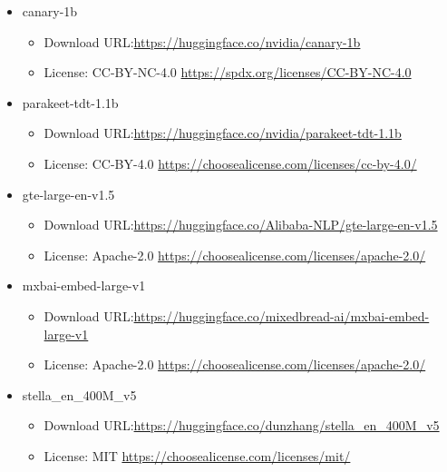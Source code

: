 \documentclass[11pt]{article}
\begin{document}
\begin{itemize}
		\item canary-1b
		\begin{itemize}
			\item Download URL:\newline \url{https://huggingface.co/nvidia/canary-1b}
			\item License: CC-BY-NC-4.0  \newline \url{https://spdx.org/licenses/CC-BY-NC-4.0}
		\end{itemize}
		
		\item parakeet-tdt-1.1b
		\begin{itemize}
			\item Download URL:\newline \url{https://huggingface.co/nvidia/parakeet-tdt-1.1b}
			\item License: CC-BY-4.0  \newline \url{https://choosealicense.com/licenses/cc-by-4.0/}
		\end{itemize}
		
		\item gte-large-en-v1.5
		\begin{itemize}
			\item Download URL:\newline \url{https://huggingface.co/Alibaba-NLP/gte-large-en-v1.5}
			\item License: Apache-2.0  \newline \url{https://choosealicense.com/licenses/apache-2.0/}
		\end{itemize}
		
		\item mxbai-embed-large-v1
		\begin{itemize}
			\item Download URL:\newline \url{https://huggingface.co/mixedbread-ai/mxbai-embed-large-v1}
			\item License: Apache-2.0  \newline \url{https://choosealicense.com/licenses/apache-2.0/}
		\end{itemize}
		
		\item stella\_en\_400M\_v5
		\begin{itemize}
			\item Download URL:\newline \url{https://huggingface.co/dunzhang/stella_en_400M_v5}
			\item License: MIT \newline \url{https://choosealicense.com/licenses/mit/}
		\end{itemize}
		
	\end{itemize}
	
\end{document}
